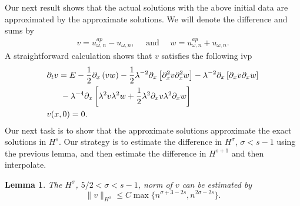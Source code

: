 \documentclass[reqno]{amsart}
\theoremstyle{plain}
\newtheorem{lemma}{Lemma}[section]
\numberwithin{equation}{section}
\begin{document}
 Our next result shows that the actual solutions with the above initial data are approximated by the approximate solutions. We will denote the difference and sums by 
 \begin{align}
 v =  u^{ap}_{\omega, n}  -  u _{\omega, n} , \quad \text{ and } \quad  w=  u^{ap}_{\omega, n}   +  u _{\omega, n}.
 \end{align}
A straightforward calculation shows that $v$ satisfies the following ivp
\begin{align}\notag
 & \partial_t v = E -  \frac12 \partial_x\left (vw  \right)  -
 \frac12 \lambda^{-2} \partial_x \left  [\partial_x^2 v  \partial_x^2 w   \right  ]
 - \lambda^{-2}  \partial_x \left [\partial_x   v \partial_x w   \right ]  
 \\ & \ \ \ \ \  -  \lambda^{-4} \partial_x \left [    \lambda ^2     v \lambda ^2     w +\frac12    \lambda ^2   \partial_x   v \lambda  ^2 \partial_x     w
   \right ]
\\ & v(x,0) = 0 .
\end{align}
 Our next task is to show that the approximate solutions approximate the exact solutions in $H^s$. Our strategy is to estimate the difference in $H^\sigma $, $\sigma < s-1$ using the previous lemma, and then estimate the difference in $H^{s+1}$ and then interpolate. 
\begin{lemma}\label{error-periodic}
The $H^\sigma$, $5/2<\sigma<s-1$, norm of $v$ can be estimated by
$$
\| v\|_{H^\sigma} \le C  \max\{ n^{\sigma+3-2s} , n^{2\sigma-2s}  \}.
$$
\end{lemma}
\end{document}
